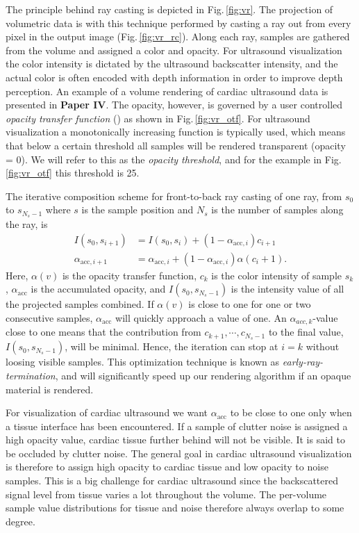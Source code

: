 The principle behind ray casting is depicted in Fig.\,\ref{fig:vr}. The projection of volumetric data is with this technique performed by casting a ray out from every pixel in the output image (Fig.\,\ref{fig:vr_rc}). Along each ray, samples are gathered from the volume and assigned a color and opacity. For ultrasound visualization the color intensity is dictated by the ultrasound backscatter intensity, and the actual color is often encoded with depth information in order to improve depth perception. An example of a volume rendering of cardiac ultrasound data is presented in \textbf{Paper IV}. The opacity, however, is governed by a user controlled \textit{opacity transfer function} () as shown in Fig.\,\ref{fig:vr_otf}. For ultrasound visualization a monotonically increasing function is typically used, which means that below a certain threshold all samples will be rendered transparent (opacity = 0). We will refer to this as the \textit{opacity threshold}, and for the example in Fig.\,\ref{fig:vr_otf} this threshold is 25.

The iterative composition scheme for front-to-back ray casting of one ray, from $s_0$ to $s_{N_s-1}$ where $s$ is the sample position and $N_s$ is the number of samples along the ray, is
\begin{align}
I(s_0, s_{i+1}) &= I(s_0, s_{i}) + (1 - \alpha_{\text{acc},i}) c_{i+1}\\
\alpha_{\text{acc},i+1} &= \alpha_{\text{acc},i} + (1 - \alpha_{\text{acc},i}) \alpha(c_i+1).
\label{eq:fronToBack}
\end{align}
Here, $\alpha(v)$ is the opacity transfer function, $c_{k}$ is the color intensity of sample $s_{k}$, $\alpha_{\text{acc}}$ is the accumulated opacity, and $I(s_0, s_{N_s-1})$ is the intensity value of all the projected samples combined. If $\alpha(v)$ is close to one for one or two consecutive samples, $\alpha_{\text{acc}}$ will quickly approach a value of one. An $\alpha_{acc,k}$-value close to one means that the contribution from $c_{k+1}, \cdots, c_{N_s-1}$ to the final value, $I(s_0, s_{N_s-1})$, will be minimal. Hence, the iteration can stop at $i=k$ without loosing visible samples. This optimization technique is known as \textit{early-ray-termination}, and will significantly speed up our rendering algorithm if an opaque material is rendered.

For visualization of cardiac ultrasound we want $\alpha_{\text{acc}}$ to be close to one only when a tissue interface has been encountered. If a sample of clutter noise is assigned a high opacity value, cardiac tissue further behind will not be visible. It is said to be occluded by clutter noise. The general goal in cardiac ultrasound visualization is therefore to assign high opacity to cardiac tissue and low opacity to noise samples. This is a big challenge for cardiac ultrasound since the backscattered signal level from tissue varies a lot throughout the volume. The per-volume sample value distributions for tissue and noise therefore always overlap to some degree.

